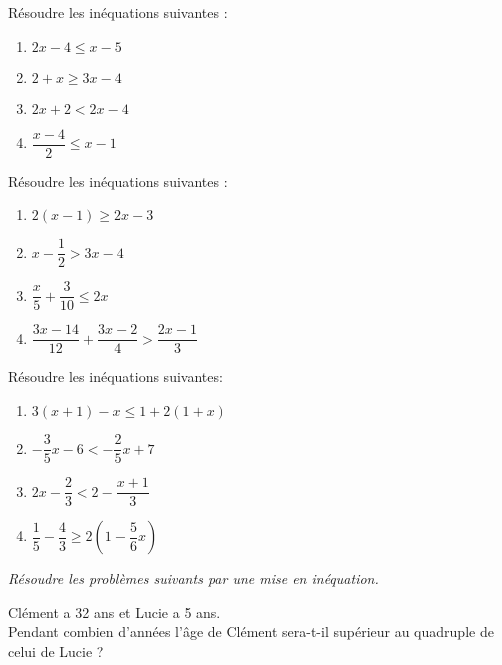 \begin{exercice}[]
Résoudre les inéquations suivantes :
\setlength{\columnseprule}{0pt}
\begin{multicols}{2}[\raggedcolumns]
\begin{enumerate}
\item $2x-4 \leq x-5$
\item ${2} + x \geq 3 x - 4$
\item ${2} x + {2} < {2} x - {4}$
\item $\dfrac{x -  {4}}{2} \leq  x - {1}$
\end{enumerate}
\end{multicols}
\end{exercice}

\begin{exercice}[]
Résoudre les inéquations suivantes :
\setlength{\columnseprule}{0pt}
\begin{multicols}{2}[\raggedcolumns]
\begin{enumerate}
\item ${2} (x - {1})  \geq  {2} x - {3}$
\item $x - \dfrac{1}{2} > {3} x - {4}$
\item $\dfrac{x} {5} + \dfrac{3}{10}   \leq {2}x$
\item $\dfrac{3 x - 14}{12} + \dfrac{3 x - 2}{4} > \dfrac{2 x - 1}{3}$
\end{enumerate}
\end{multicols}
\end{exercice}

\begin{exercice}[]
Résoudre les inéquations suivantes:
\setlength{\columnseprule}{0pt}
\begin{multicols}{2}[\raggedcolumns]
\begin{enumerate}
\item $3(x+1)-x\leq1+2(1+x)$
\item $-\dfrac{3}{5}x-6 < - \dfrac{2}{5}x+7$
\item $2x-\dfrac{2}{3}<2-\dfrac{x+1}{3}$ \\
\item $\dfrac{1}{5}-\dfrac{4}{3}\geq2\left( 1-\dfrac{5}{6}x\right) $
\end{enumerate}
\end{multicols}
\end{exercice}

\begin{center}
\textit{Résoudre les problèmes suivants par une mise en inéquation.}
\end{center}
\begin{exercice}[]
Clément a 32 ans et Lucie a 5 ans.\\
Pendant combien d’années l’âge de Clément sera-t-il supérieur au quadruple de celui de Lucie ?
\end{exercice}

